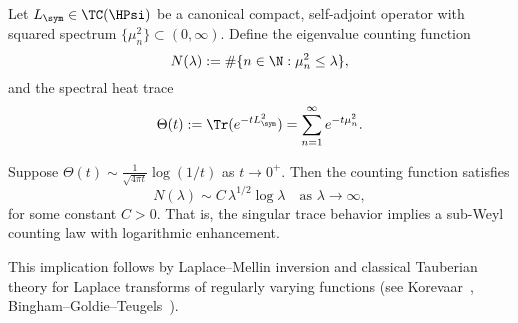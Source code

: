 \begin{lemma}
\label{lem:tauberian_heat_trace_application}
Let \( L_{\sym} \in \TC(\HPsi) \) be a canonical compact, self-adjoint operator with squared spectrum \( \{ \mu_n^2 \} \subset (0, \infty) \). Define the eigenvalue counting function
\[
N(\lambda) := \#\{ n \in \N : \mu_n^2 \le \lambda \},
\]
and the spectral heat trace
\[
\Theta(t) := \Tr(e^{-t L_{\sym}^2}) = \sum_{n=1}^\infty e^{-t \mu_n^2}.
\]

\medskip
\noindent
Suppose \( \Theta(t) \sim \frac{1}{\sqrt{4\pi t}} \log(1/t) \) as \( t \to 0^+ \). Then the counting function satisfies
\[
N(\lambda) \sim C \, \lambda^{1/2} \log \lambda \quad \text{as } \lambda \to \infty,
\]
for some constant \( C > 0 \). That is, the singular trace behavior implies a sub-Weyl counting law with logarithmic enhancement.

\medskip
\noindent
This implication follows by Laplace–Mellin inversion and classical Tauberian theory for Laplace transforms of regularly varying functions (see Korevaar~\cite[Thm.~4.12.9]{Korevaar2004Tauberian}, Bingham–Goldie–Teugels~\cite[Thm.~1.7.1]{BGT1989RegularVariation}).
\end{lemma}
